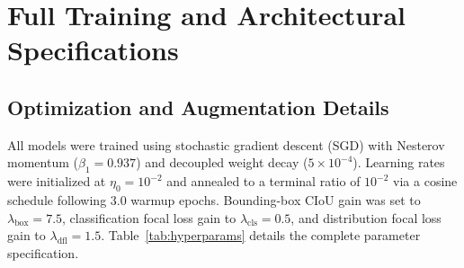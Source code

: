 \documentclass[conference]{IEEEtran}
\begin{document}
\section{Full Training and Architectural Specifications}
\label{app:hyperparams}

\subsection{Optimization and Augmentation Details}
All models were trained using stochastic gradient descent (SGD) with Nesterov momentum ($\beta_1 = 0.937$) and decoupled weight decay ($5 \times 10^{-4}$). Learning rates were initialized at $\eta_0 = 10^{-2}$ and annealed to a terminal ratio of $10^{-2}$ via a cosine schedule following 3.0 warmup epochs. Bounding-box CIoU gain was set to $\lambda_{\text{box}} = 7.5$, classification focal loss gain to $\lambda_{\text{cls}} = 0.5$, and distribution focal loss gain to $\lambda_{\text{dfl}} = 1.5$. Table~\ref{tab:hyperparams} details the complete parameter specification.

\begin{table}[h]
\centering
\renewcommand{\arraystretch}{0.80}
\caption{Hyperparameter Specification for Active Detector Training.}
\label{tab:hyperparams}
\end{table}
\end{document}
